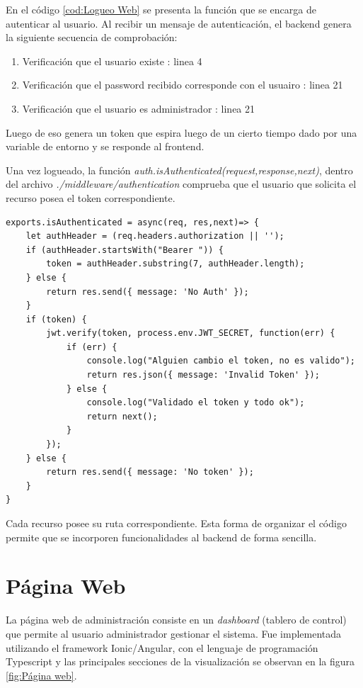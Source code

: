 En el código \ref{cod:Logueo Web} se presenta la función que se encarga de autenticar al usuario. Al recibir un mensaje de autenticación, el backend genera la siguiente secuencia de comprobación:
\begin{enumerate}
\item Verificación que el usuario existe : linea 4
\item Verificación que el password recibido corresponde con el usuairo : linea 21
\item Verificación que el usuario es administrador : linea 21
\end{enumerate}

Luego de eso genera un token que espira luego de un cierto tiempo dado por una variable de entorno y se responde al frontend.

Una vez logueado, la función \textit{auth.isAuthenticated(request,response,next)}, dentro del archivo \textit{./middleware/authentication} comprueba que el usuario que solicita el recurso posea el token correspondiente.
\begin{lstlisting}[label=cod: Autorización,caption=  Control de token.]
exports.isAuthenticated = async(req, res,next)=> {
    let authHeader = (req.headers.authorization || '');
    if (authHeader.startsWith("Bearer ")) {
        token = authHeader.substring(7, authHeader.length);
    } else {
        return res.send({ message: 'No Auth' });
    }
    if (token) {
        jwt.verify(token, process.env.JWT_SECRET, function(err) {
            if (err) {
                console.log("Alguien cambio el token, no es valido");
                return res.json({ message: 'Invalid Token' });
            } else {
                console.log("Validado el token y todo ok");
                return next();
            }
        });
    } else {
        return res.send({ message: 'No token' });
    }
}
\end{lstlisting}

Cada recurso posee su ruta correspondiente. Esta forma de organizar el código permite que se incorporen funcionalidades al backend de forma sencilla.

\pagebreak

\section{Página Web}

La página web de administración consiste en un \textit{dashboard} (tablero de control) que permite al usuario administrador gestionar el sistema.
Fue implementada utilizando el framework Ionic/Angular, con el lenguaje de programación Typescript y las principales secciones de la visualización se observan en la figura \ref{fig:Página web}.

